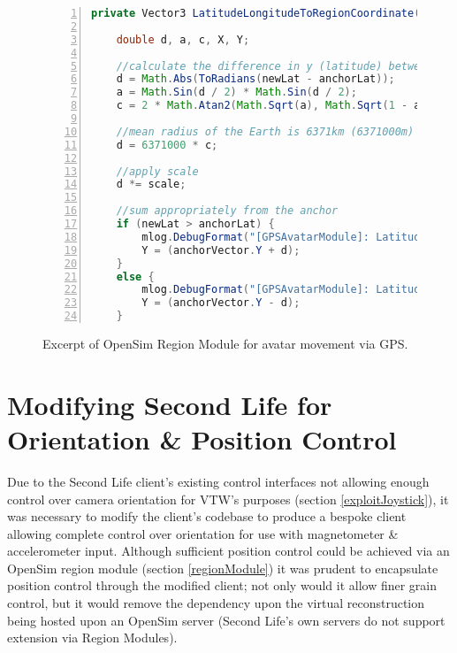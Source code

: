 \begin{figure}[h]
\begin{lstlisting}[language=Java, numbers=left, numberstyle=\small, stepnumber=1, frame=single, breaklines=true, backgroundcolor=\color{codebackground}, showstringspaces=false]
private Vector3 LatitudeLongitudeToRegionCoordinate(double newLat, double newLong, double anchorLat, double anchorLong, Vector3 anchorVector, double scale) {

    double d, a, c, X, Y;

    //calculate the difference in y (latitude) between the anchor & the new reading
    d = Math.Abs(ToRadians(newLat - anchorLat));
    a = Math.Sin(d / 2) * Math.Sin(d / 2);
    c = 2 * Math.Atan2(Math.Sqrt(a), Math.Sqrt(1 - a));

    //mean radius of the Earth is 6371km (6371000m)
    d = 6371000 * c;

    //apply scale
    d *= scale;

    //sum appropriately from the anchor
    if (newLat > anchorLat) {
        mlog.DebugFormat("[GPSAvatarModule]: LatitudeLongitudeToRegionCoordinate() - (Y) newLat > anchorLat.");
        Y = (anchorVector.Y + d);
    }
    else {
        mlog.DebugFormat("[GPSAvatarModule]: LatitudeLongitudeToRegionCoordinate() - (Y) newLat < anchorLat.");
        Y = (anchorVector.Y - d);
    }
\end{lstlisting}
\label{RegionModuleCode1}
\caption{Excerpt of OpenSim Region Module for avatar movement via GPS.}
\end{figure}


\clearpage


\section{Modifying Second Life for Orientation \& Position Control}
Due to the Second Life client's existing control interfaces not allowing enough control over camera orientation for VTW's purposes (section \ref{exploitJoystick}), it was necessary to modify the client's codebase to produce a bespoke client allowing complete control over orientation for use with magnetometer \& accelerometer input. Although sufficient position control could be achieved via an OpenSim region module (section \ref{regionModule}) it was prudent to encapsulate position control through the modified client; not only would it allow finer grain control, but it would remove the dependency upon the virtual reconstruction being hosted upon an OpenSim server (Second Life's own servers do not support extension via Region Modules).





